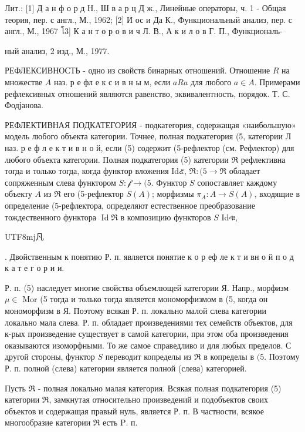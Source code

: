 \documentclass[10pt]{article}
\begin{document}
Лит.: [1] Д а н ф о р д Н., Ш в а р ц Д ж., Линейные операторы, ч. 1 - Общая теория, пер. с англ., М., 1962; [2] И ос и Да К., Функциональный анализ, пер. с англ., М., 1967 โ3] К а н т о р о в и ч Л. В., А к и л о в Г. П., Функциональ-

ный анализ, 2 изд., М., 1977.



РЕФЛЕКСИВНОСТЬ - одно из свойств бинарных отношений. Отношение $R$ на множестве $A$ наз. р е фл е к с и в н ы м, если $a R a$ для любого $a \in A$. Примерами рефлексивных отношений являются равенство, эквивалентность, порядок. Т. С. Фодјанова.



РЕФЛЕКТИВНАЯ ПОДКАТЕГОРИЯ - подкатегория, содержащая «наибольшую» модель любого объекта категории. Точнее, полная подкатегория (5, категории Л наз. р е ф л е к т и в н о й, если (5) содержит (5-рефлектор (см. Рефлектор) для любого объекта категории. Полная подкатегория (5) категории $\mathscr{\Re}$ рефлективна тогда и только тогда, когда функтор вложения Id๕, $\mathfrak{\Re}:(5 \rightarrow \Re$ обладает сопряженным слева функтором $S: \mathscr{f} \rightarrow(5$. Функтор $S$ сопоставляет каждому объекту $A$ из $\mathfrak{\Re}$ его (5-рефлектор $S(A)$; морфизмы $\pi_{A}: A \rightarrow S(A)$, входящие в определение (5-рефлектора, определяют естественное преобразование тождественного функтора $\operatorname{Id} \Re$ в композицию функторов $S$ Idঞ, \begin{CJK}{UTF8}{mj}凡\end{CJK}. Двойственным к понятию Р. п. является понятие к о р еф ле к т и вн $о$ й п о д к а т е г о р и и.



Р. п. (5) наследует многие свойства объемлющей категории Я. Напр., морфизм $\mu \in$ Mor (5 тогда и только тогда является мономорфизмом в (5, когда он мономорфизм в Я. Поэтому всякая Р. п. локально малой слева категории локально мала слева. Р. п. обладает произведениями тех семейств объектов, для к-рых произведение существует в самой категории, при этом оба произведения оказываются изоморфными. То же самое справедливо и для любых пределов. С другой стороны, функтор $S$ переводит копределы из $\mathfrak{R}$ в копределы в $(5$. Поэтому Р. п. полной (слева) категории является полной (слева) категорией.



Пусть $\Re$ - полная локально малая категория. Всякая полная подкатегория (5) категории $\mathfrak{R}$, замкнутая относительно произведений и подобъектов своих объектов и содержащая правый нуль, является Р. п. В частности, всякое многообразие категории $\Re$ есть $\mathrm{P}$. п.
\end{document}
